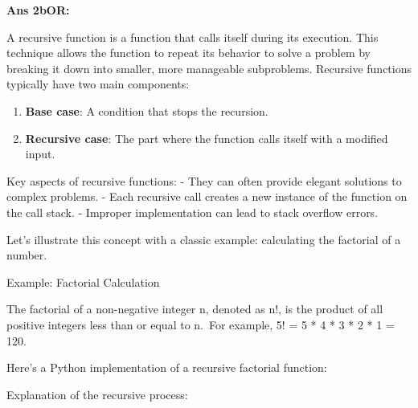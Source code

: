 \textbf{Ans 2bOR:}

A recursive function is a function that calls itself during its
execution. This technique allows the function to repeat its behavior to
solve a problem by breaking it down into smaller, more manageable
subproblems. Recursive functions typically have two main components:

\begin{enumerate}
\def\labelenumi{\arabic{enumi}.}
\tightlist
\item
  \textbf{Base case}: A condition that stops the recursion.
\item
  \textbf{Recursive case}: The part where the function calls itself with
  a modified input.
\end{enumerate}

Key aspects of recursive functions: - They can often provide elegant
solutions to complex problems. - Each recursive call creates a new
instance of the function on the call stack. - Improper implementation
can lead to stack overflow errors.

Let's illustrate this concept with a classic example: calculating the
factorial of a number.

Example: Factorial Calculation

The factorial of a non-negative integer n, denoted as n!, is the product
of all positive integers less than or equal to n.~For example, 5! = 5 *
4 * 3 * 2 * 1 = 120.

Here's a Python implementation of a recursive factorial function:

\begin{Shaded}
\begin{Highlighting}[]
    \OperatorTok{==}  \OperatorTok{==} \NormalTok{:}
         
    
    \NormalTok{:}
        \OperatorTok{*}\OperatorTok{{-}} \NormalTok{)}

\NormalTok{))  }
\end{Highlighting}
\end{Shaded}

Explanation of the recursive process:

